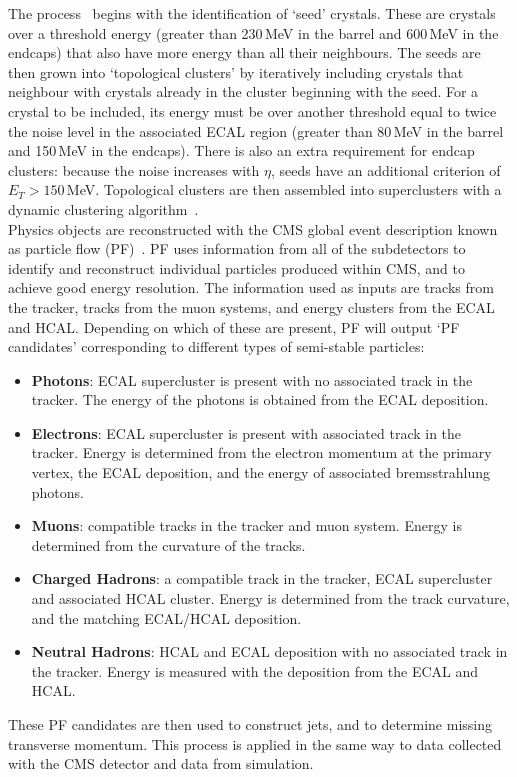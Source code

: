 The process~\cite{CMSEcalTDR} begins with the identification of `seed' crystals. These are crystals over a threshold energy (greater than 230\,MeV in the barrel and 600\,MeV in the endcaps) that also have more energy than all their neighbours.
The seeds are then grown into `topological clusters' by iteratively including crystals that neighbour with crystals already in the cluster beginning with the seed.
For a crystal to be included, its energy must be over another threshold equal to twice the noise level in the associated ECAL region (greater than 80\,MeV in the barrel and 150\,MeV in the endcaps).
There is also an extra requirement for endcap clusters: because the noise increases with $\eta$, seeds have an additional criterion of $E_T > 150$\,MeV.
Topological clusters are then assembled into superclusters with a dynamic clustering algorithm~\cite{CMSEcalTDR}.
\\

Physics objects are reconstructed with the CMS global event description known as particle flow (PF)~\cite{ParticleFlow}.
PF uses information from all of the subdetectors to identify and reconstruct individual particles produced within CMS, and to achieve good energy resolution.
The information used as inputs are tracks from the tracker, tracks from the muon systems, and energy clusters from the ECAL and HCAL. Depending on which of these are present, PF will output `PF candidates' corresponding to different types of semi-stable particles:
\begin{itemize}[noitemsep]
    \item \textbf{Photons}: ECAL supercluster is present with no associated track in the tracker. 
                            The energy of the photons is obtained from the ECAL deposition. 
    \item \textbf{Electrons}: ECAL supercluster is present with associated track in the tracker. 
                              Energy is determined from the electron momentum at the primary vertex, the ECAL deposition, and the energy of associated bremsstrahlung photons. 
    \item \textbf{Muons}: compatible tracks in the tracker and muon system. 
                          Energy is determined from the curvature of the tracks. 
    \item \textbf{Charged Hadrons}: a compatible track in the tracker, ECAL supercluster and associated HCAL cluster. 
                                    Energy is determined from the track curvature, and the matching ECAL/HCAL deposition.
    \item \textbf{Neutral Hadrons}: HCAL and ECAL deposition with no associated track in the tracker. 
                                    Energy is measured with the deposition from the ECAL and HCAL. 
\end{itemize}
These PF candidates are then used to construct jets, and to determine missing transverse momentum.
This process is applied in the same way to data collected with the CMS detector and data from simulation.


